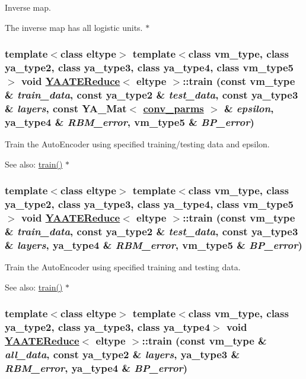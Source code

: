 Inverse map. 

The inverse map has all logistic units. $\ast$ \hypertarget{class_y_a_a_t_e_reduce_a13}{
\subsubsection[train]{\setlength{\rightskip}{0pt plus 5cm}template$<$class eltype$>$ template$<$class vm\_\-type, class ya\_\-type2, class ya\_\-type3, class ya\_\-type4, class vm\_\-type5$>$ void \hyperlink{class_y_a_a_t_e_reduce}{YAATEReduce}$<$ eltype $>$::train (const vm\_\-type \& {\em train\_\-data}, const ya\_\-type2 \& {\em test\_\-data}, const ya\_\-type3 \& {\em layers}, const YA\_\-Mat$<$ \hyperlink{struct_y_a_a_t_e_reduce_1_1conv__parms}{conv\_\-parms} $>$ \& {\em epsilon}, ya\_\-type4 \& {\em RBM\_\-error}, vm\_\-type5 \& {\em BP\_\-error})}}
\label{class_y_a_a_t_e_reduce_a13}


Train the Auto\-Encoder using specified training/testing data and epsilon. 

\begin{Desc}
\item[See also:]\hyperlink{class_y_a_a_t_e_reduce_a11}{train()} $\ast$ \end{Desc}
\hypertarget{class_y_a_a_t_e_reduce_a12}{
\subsubsection[train]{\setlength{\rightskip}{0pt plus 5cm}template$<$class eltype$>$ template$<$class vm\_\-type, class ya\_\-type2, class ya\_\-type3, class ya\_\-type4, class vm\_\-type5$>$ void \hyperlink{class_y_a_a_t_e_reduce}{YAATEReduce}$<$ eltype $>$::train (const vm\_\-type \& {\em train\_\-data}, const ya\_\-type2 \& {\em test\_\-data}, const ya\_\-type3 \& {\em layers}, ya\_\-type4 \& {\em RBM\_\-error}, vm\_\-type5 \& {\em BP\_\-error})}}
\label{class_y_a_a_t_e_reduce_a12}


Train the Auto\-Encoder using specified training and testing data. 

\begin{Desc}
\item[See also:]\hyperlink{class_y_a_a_t_e_reduce_a11}{train()} $\ast$ \end{Desc}
\hypertarget{class_y_a_a_t_e_reduce_a11}{
\subsubsection[train]{\setlength{\rightskip}{0pt plus 5cm}template$<$class eltype$>$ template$<$class vm\_\-type, class ya\_\-type2, class ya\_\-type3, class ya\_\-type4$>$ void \hyperlink{class_y_a_a_t_e_reduce}{YAATEReduce}$<$ eltype $>$::train (const vm\_\-type \& {\em all\_\-data}, const ya\_\-type2 \& {\em layers}, ya\_\-type3 \& {\em RBM\_\-error}, ya\_\-type4 \& {\em BP\_\-error})}}
\label{class_y_a_a_t_e_reduce_a11}


